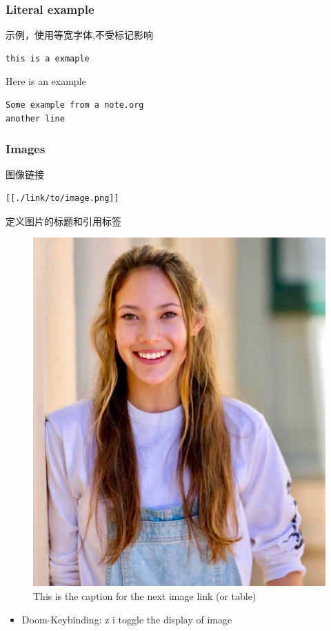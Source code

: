 \documentclass[11pt]{article}
\begin{document}
\subsubsection{Literal example}
\label{sec:orge1d3fda}
示例，使用等宽字体,不受标记影响
\begin{verbatim}
this is a exmaple
\end{verbatim}

Here is an example
\begin{verbatim}
Some example from a note.org
another line
\end{verbatim}
\subsubsection{Images}
\label{sec:orgfbb08cf}
图像链接
\begin{verbatim}
[[./link/to/image.png]]
\end{verbatim}


定义图片的标题和引用标签
\begin{figure}[htbp]
\centering
\includegraphics[width=.9\linewidth]{./image.png}
\caption{\label{test}This is the caption for the next image link (or table)}
\end{figure}

\begin{itemize}
\item Doom-Keybinding: z i
toggle the display of image
\end{itemize}
\end{document}
